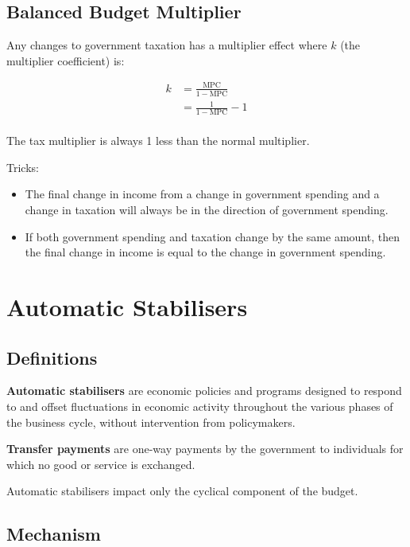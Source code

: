 \documentclass[a4paper,11pt]{article}
\begin{document}
\subsection{Balanced Budget Multiplier}

Any changes to government taxation has a multiplier effect where $k$ (the
multiplier coefficient) is:

$$
\begin{aligned}
k & = \frac{\text{MPC}}{1 - \text{MPC}} \\
& = \frac{1}{1 - \text{MPC}} - 1 \\
\end{aligned}
$$

The tax multiplier is always 1 less than the normal multiplier.

Tricks:

\begin{itemize}
\item The final change in income from a change in government spending and a
	change in taxation will always be in the direction of government spending.
\item If both government spending and taxation change by the same amount, then
	the final change in income is equal to the change in government spending.
\end{itemize}



\section{Automatic Stabilisers}

\subsection{Definitions}

\textbf{Automatic stabilisers} are economic policies and programs designed to
respond to and offset fluctuations in economic activity throughout the various
phases of the business cycle, without intervention from policymakers.

\textbf{Transfer payments} are one-way payments by the government to individuals
for which no good or service is exchanged.

Automatic stabilisers impact only the cyclical component of the budget.


\subsection{Mechanism}
\end{document}
